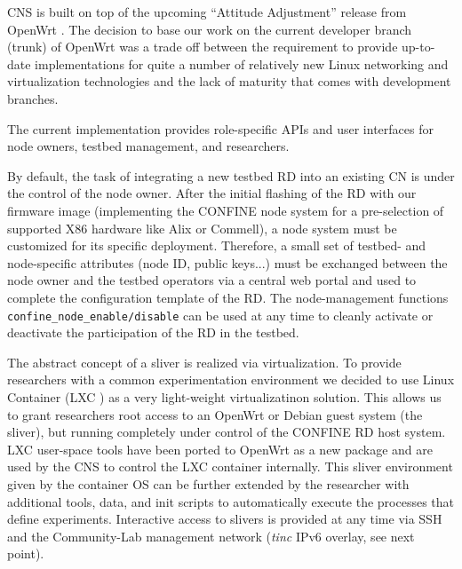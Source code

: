 \documentclass[conference]{IEEEtran}
\begin{document}
CNS is built on top of the upcoming ``Attitude Adjustment'' release
from OpenWrt \cite{attitudeAdjustment}. The decision to base our work
on the current developer branch (trunk) of OpenWrt was a trade off
between the requirement to provide up-to-date implementations for
quite a number of relatively new Linux networking and virtualization
technologies and the lack of maturity that comes with development
branches. 

The current implementation provides role-specific APIs and user
interfaces for node owners, testbed management, and researchers.

By default, the task of integrating a new testbed RD into an existing
CN is under the control of the node owner.  After the initial flashing
of the RD with our firmware image (implementing the CONFINE node
system for a pre-selection of supported X86 hardware like Alix or
Commell), a node system must be customized for its specific deployment.
Therefore, a small set of testbed- and node-specific attributes
(node ID, public keys...) must be exchanged between the node owner
and the testbed operators via a central web portal and used to
complete the configuration template of the RD.  The
node-management functions \texttt{confine\_node\_enable/disable} can be used at
any time to cleanly activate or deactivate the participation of the RD
in the testbed.


The abstract concept of a sliver is realized via virtualization.  To
provide researchers with a common experimentation environment we
decided to use Linux Container (LXC \cite{lxc}) as a very light-weight
virtualizatinon solution. This allows us to grant researchers root
access to an OpenWrt or Debian guest system (the sliver), but running
completely under control of the CONFINE RD host system. LXC user-space
tools have been ported to OpenWrt as a new package and are used by
the CNS to control the LXC container internally. This sliver
environment given by the container OS can be further extended by the
researcher with additional tools, data, and init scripts to
automatically execute the processes that define experiments.
Interactive access to slivers is provided at any time via SSH and the
Community-Lab management network (\emph{tinc} IPv6 overlay, see next point).
\end{document}
